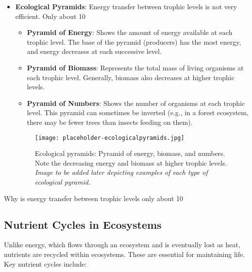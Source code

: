 \begin{itemize}
    \item \textbf{Ecological Pyramids}:  Energy transfer between trophic levels is not very efficient.  Only about 10%

    \begin{itemize}
        \item \textbf{Pyramid of Energy}: Shows the amount of energy available at each trophic level.  The base of the pyramid (producers) has the most energy, and energy decreases at each successive level.
        \item \textbf{Pyramid of Biomass}: Represents the total mass of living organisms at each trophic level.  Generally, biomass also decreases at higher trophic levels.
        \item \textbf{Pyramid of Numbers}: Shows the number of organisms at each trophic level.  This pyramid can sometimes be inverted (e.g., in a forest ecosystem, there may be fewer trees than insects feeding on them).
    \end{itemize}

    \begin{figure}[h]
        \texttt{[image: placeholder-ecologicalpyramids.jpg]}
        \caption{Ecological pyramids: Pyramid of energy, biomass, and numbers. Note the decreasing energy and biomass at higher trophic levels. \textit{Image to be added later depicting examples of each type of ecological pyramid.}}
    \end{figure}
\end{itemize}

\begin{stopandthink}
Why is energy transfer between trophic levels only about 10%
\end{stopandthink}

\subsection{Nutrient Cycles in Ecosystems}

Unlike energy, which flows through an ecosystem and is eventually lost as heat, nutrients are recycled within ecosystems. These  are essential for maintaining life.  Key nutrient cycles include:

